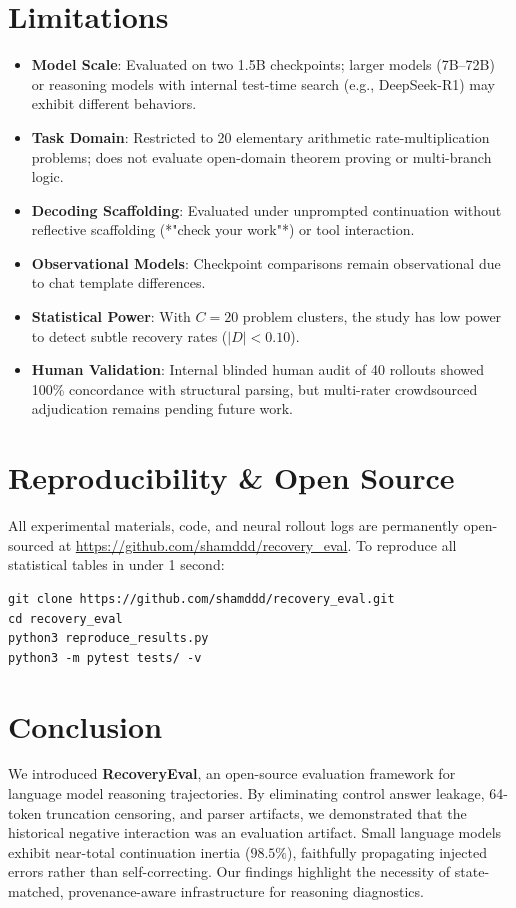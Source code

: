 \documentclass[10pt,conference]{IEEEtran}
\begin{document}
\section{Limitations}
\begin{itemize}
    \item \textbf{Model Scale}: Evaluated on two 1.5B checkpoints; larger models (7B--72B) or reasoning models with internal test-time search (e.g., DeepSeek-R1) may exhibit different behaviors.
    \item \textbf{Task Domain}: Restricted to 20 elementary arithmetic rate-multiplication problems; does not evaluate open-domain theorem proving or multi-branch logic.
    \item \textbf{Decoding Scaffolding}: Evaluated under unprompted continuation without reflective scaffolding (*"check your work"*) or tool interaction.
    \item \textbf{Observational Models}: Checkpoint comparisons remain observational due to chat template differences.
    \item \textbf{Statistical Power}: With $C=20$ problem clusters, the study has low power to detect subtle recovery rates ($|D| < 0.10$).
    \item \textbf{Human Validation}: Internal blinded human audit of 40 rollouts showed 100\% concordance with structural parsing, but multi-rater crowdsourced adjudication remains pending future work.
\end{itemize}

\section{Reproducibility \& Open Source}
All experimental materials, code, and neural rollout logs are permanently open-sourced at \url{https://github.com/shamddd/recovery_eval}. 
To reproduce all statistical tables in under 1 second:
\begin{verbatim}
git clone https://github.com/shamddd/recovery_eval.git
cd recovery_eval
python3 reproduce_results.py
python3 -m pytest tests/ -v
\end{verbatim}

\section{Conclusion}
We introduced \textbf{RecoveryEval}, an open-source evaluation framework for language model reasoning trajectories. By eliminating control answer leakage, 64-token truncation censoring, and parser artifacts, we demonstrated that the historical negative interaction was an evaluation artifact. Small language models exhibit near-total continuation inertia ($98.5\%$), faithfully propagating injected errors rather than self-correcting. Our findings highlight the necessity of state-matched, provenance-aware infrastructure for reasoning diagnostics.
\end{document}
